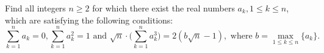 Find all integers $n\geq 2$ for which there exist the real numbers $a_k, 1\leq k \leq n$,  which are satisfying the following conditions:\[\sum_{k=1}^n a_k=0, \sum_{k=1}^n a_k^2=1 \text{ and } \sqrt{n}\cdot \Bigr(\sum_{k=1}^n a_k^3\Bigr)=2(b\sqrt{n}-1), \text{ where } b=\max_{1\leq k\leq n} \{a_k\}.\]